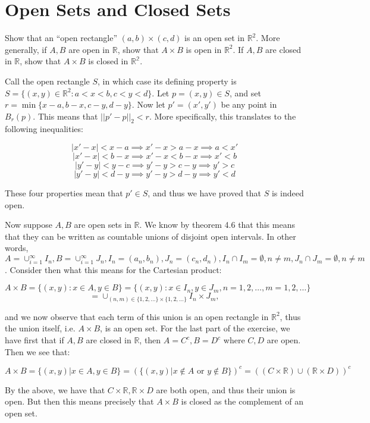 \chapter{Open Sets and Closed Sets}

\begin{exercise}{1}
    Show that an ``open rectangle'' $(a, b) \times (c, d)$ is an open set in $\mathbb{R}^2$.
    More generally, if $A, B$ are open in $\mathbb{R}$, show that $A \times B$ is open in $\mathbb{R}^2$.
    If $A, B$ are closed in $\mathbb{R}$, show that $A \times B$ is closed in $\mathbb{R^2}$.
\end{exercise}

\begin{solution}
    
    Call the open rectangle $S$, in which case its defining property is $S = \{(x, y) \in \mathbb{R}^2 : a < x < b, c < y < d\}$.
    Let $p = (x, y) \in S$, and set $r = \min\{x - a, b - x, c - y, d - y\}$.
    Now let $p' = (x', y')$ be any point in $B_r(p)$.
    This means that $\lvert \lvert p' - p \rvert \rvert_2 < r$.
    More specifically, this translates to the following inequalities:

    $$\lvert x' - x \rvert < x - a \implies x' - x > a - x \implies a < x'$$
    $$\lvert x' - x \rvert < b - x \implies x' - x < b - x \implies x' < b$$    
    $$\lvert y' - y \rvert < y - c \implies y' - y > c - y \implies y' > c$$
    $$\lvert y' - y \rvert < d - y \implies y' - y > d - y \implies y' < d$$

    These four properties mean that $p' \in S$, and thus we have proved that $S$ is indeed open.

    Now suppose $A, B$ are open sets in $\mathbb{R}$.
    We know by theorem 4.6 that this means that they can be written as countable unions of disjoint open intervals.
    In other words, $A = \cup_{i=1}^{\infty} I_n, B = \cup_{i=1}^{\infty} J_n, I_n = (a_n, b_n), J_n = (c_n, d_n), I_n \cap I_m = \emptyset, n \neq m, J_n \cap J_m = \emptyset, n \neq m$.
    Consider then what this means for the Cartesian product:

    $$A \times B = \{(x, y): x \in A, y \in B\} = \{(x, y): x \in I_n, y \in J_m, n = 1, 2, \ldots, m = 1, 2, \ldots\} $$
    $$ = \cup_{(n, m) \in \{1, 2, \ldots\} \times \{1, 2, \ldots\}} I_n \times J_m,$$

    and we now observe that each term of this union is an open rectangle in $\mathbb{R}^2$, thus the union itself, i.e. $A \times B$, is an open set.
    For the last part of the exercise, we have first that if $A, B$ are closed in $\mathbb{R}$, then $A = C^c, B = D^c$ where $C, D$ are open.
    Then we see that:

    $$A \times B = \{(x, y) \lvert x \in A, y \in B\} = (\{(x, y) \lvert x \notin A \text{ or } y \notin B\})^c = ((C \times \mathbb{R}) \cup (\mathbb{R} \times D))^c$$

    By the above, we have that $C \times \mathbb{R}, \mathbb{R} \times D$ are both open, and thus their union is open.
    But then this means precisely that $A \times B$ is closed as the complement of an open set.
\end{solution}

